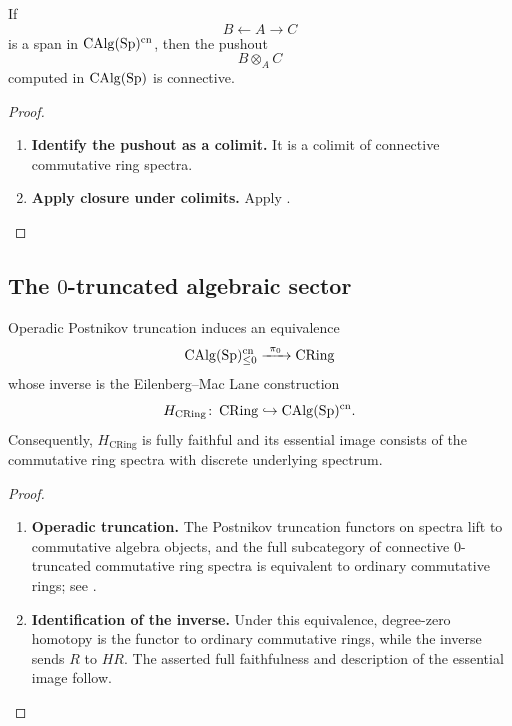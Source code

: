 \begin{corollary}
\label{cor:connective-calg-pushouts}
If
\[
    B
    \longleftarrow
    A
    \longrightarrow
    C
\]
is a span in $\operatorname{CAlg}(\operatorname{Sp})^{\mathrm{cn}}$, then the pushout
\[
    B\otimes_A C
\]
computed in $\operatorname{CAlg}(\operatorname{Sp})$ is connective.
\end{corollary}

\begin{proof}
\leavevmode
\begin{enumerate}[label=\textup{(\arabic*)}]
    \item \textbf{Identify the pushout as a colimit.}
    It is a colimit of connective commutative ring spectra.

    \item \textbf{Apply closure under colimits.}
    Apply
    .
\end{enumerate}
\end{proof}

\subsection{The \texorpdfstring{$0$}{0}-truncated algebraic sector}

\begin{proposition}
\label{prop:discrete-commutative-ring-spectra}
Operadic Postnikov truncation induces an equivalence
\[
    \operatorname{CAlg}(\operatorname{Sp})^{\mathrm{cn}}_{\leq0}
    \xrightarrow{\ \pi_0\ }
    \operatorname{CRing}
\]
whose inverse is the Eilenberg--Mac Lane construction
\[
    H_{\mathrm{CRing}}
    \colon
    \operatorname{CRing}
    \hookrightarrow
    \operatorname{CAlg}(\operatorname{Sp})^{\mathrm{cn}}.
\]
Consequently, \(H_{\mathrm{CRing}}\) is fully faithful and its essential image consists of the
commutative ring spectra with discrete underlying spectrum.
\end{proposition}

\begin{proof}
\leavevmode
\begin{enumerate}[label=\textup{(\arabic*)}]
    \item \textbf{Operadic truncation.}
    The Postnikov truncation functors on spectra lift to commutative algebra
    objects, and the full subcategory of connective \(0\)-truncated
    commutative ring spectra is equivalent to ordinary commutative rings; see
    \cite{LurieHigherAlgebra,LurieSAG}.

    \item \textbf{Identification of the inverse.}
    Under this equivalence, degree-zero homotopy is the functor to ordinary
    commutative rings, while the inverse sends \(R\) to \(HR\). The asserted
    full faithfulness and description of the essential image follow.
\end{enumerate}
\end{proof}

